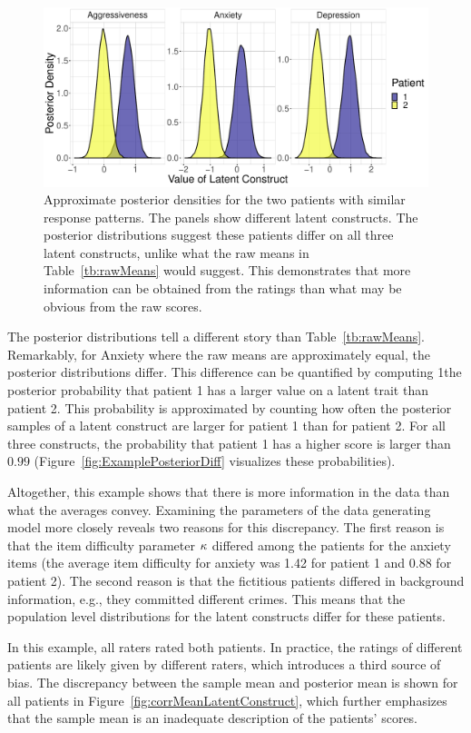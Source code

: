 \documentclass[a4paper,usenames,dvipsnames]{article}
\newcommand{\DON}	[1] 	{}%
\newcommand{\MR}	[1] 	{}%
\begin{document}
\begin{figure}[!ht]
	\includegraphics[width=\textwidth]{figures/twoPatientsDensity.pdf}
	\caption{Approximate posterior densities for the two patients with similar response patterns. The panels show different latent constructs. The posterior distributions suggest these patients differ on all three latent constructs, unlike what the raw means in Table~\ref{tb:rawMeans} would suggest. This demonstrates that more information can be obtained from the ratings than what may be obvious from the raw scores.}
	\label{fig:ExamplePosterior}
\end{figure}
The posterior distributions tell a different story than Table~\ref{tb:rawMeans}. Remarkably, for Anxiety where the raw means are approximately equal, the posterior distributions differ. This difference can be quantified by computing 1the posterior probability that patient 1 has a larger value on a latent trait than patient 2. This probability is approximated by counting how often the posterior samples of a latent construct are larger for patient 1 than for patient 2. For all three constructs, the probability that patient 1 has a higher score is larger than $0.99$ (Figure~\ref{fig:ExamplePosteriorDiff} visualizes these probabilities).

Altogether, this example shows that there is more information in the data than what the averages convey. Examining the parameters of the data generating model more closely reveals two reasons for this discrepancy. The first reason is that the item difficulty parameter $\kappa$ differed among the patients for the anxiety items (the average item difficulty for anxiety was 1.42 for patient 1 and 0.88 for patient 2). The second reason is that the fictitious patients differed in background information, e.g., they committed different crimes. This means that the population level distributions for the latent constructs differ for these patients.
\MR{does this mean that each patient is being compared to his crime group, rather than to each other? Eg., is patient I more anxious than patient 2, or just more anxious given his crime?}
\DON{It means that their population level means are estimated separately (and patients are shrunken towards those means). Patients are compared to all other patients.}
In this example, all raters rated both patients. In practice, the ratings of different patients are likely given by different raters, which introduces a third source of bias. The discrepancy between the sample mean and posterior mean is shown for all patients in Figure~\ref{fig:corrMeanLatentConstruct}, which further emphasizes that the sample mean is an inadequate description of the patients' scores.
\end{document}
